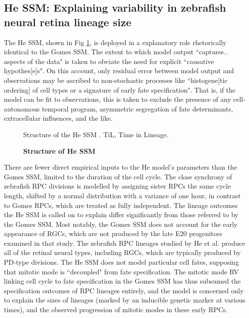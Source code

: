  \subsection{He SSM: Explaining variability in zebrafish neural retina lineage size}
 
The He SSM, shown in Fig \ref{HeSSM}, is deployed in a explanatory role rhetorically identical to the Gomes SSM. The extent to which model output ``captures.. aspects of the data" is taken to obviate the need for explicit ``causative hypothes[e]s". On this account, only residual error between model output and observations may be ascribed to non-stochastic processes like ``histogene[tic ordering] of cell types or a signature of early fate specification". That is, if the model can be fit to observations, this is taken to exclude the presence of any cell-autonomous temporal program, asymmetric segregation of fate determinants, extracellular influences, and the like. 

\begin{figure}[!h]
\caption{{\bf Structure of He SSM}}
Structure of the He SSM \cite{He2012}. TiL, Time in Lineage.
\label{HeSSM}
\end{figure}

There are fewer direct empirical inputs to the He model's parameters than the Gomes SSM, limited to the duration of the cell cycle. The close synchrony of zebrafish RPC divisions is modelled by assigning sister RPCs the same cycle length, shifted by a normal distribution with a variance of one hour, in contrast to Gomes RPCs, which are treated as fully independent. The lineage outcomes the He SSM is called on to explain differ significantly from those referred to by the Gomes SSM. Most notably, the Gomes SSM does not account for the early appearance of RGCs, which are not produced by the late E20 progenitors examined in that study. The zebrafish RPC lineages studied by He et al. produce all of the retinal neural types, including RGCs, which are typically produced by PD-type divisions. The He SSM does not model particular cell fates, supposing that mitotic mode is ``decoupled" from fate specification. The mitotic mode RV linking cell cycle to fate specification in the Gomes SSM has thus subsumed the specification outcomes of RPC lineages entirely, and the model is concerned only to explain the sizes of lineages (marked by an inducible genetic marker at various times), and the observed progression of mitotic modes in these early RPCs.

